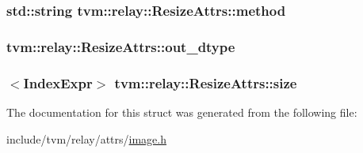 \subsubsection[{\texorpdfstring{method}{method}}]{\setlength{\rightskip}{0pt plus 5cm}std\+::string tvm\+::relay\+::\+Resize\+Attrs\+::method}\hypertarget{structtvm_1_1relay_1_1ResizeAttrs_a45a5182646e979ac0d4f1f181005e7d6}{}\label{structtvm_1_1relay_1_1ResizeAttrs_a45a5182646e979ac0d4f1f181005e7d6}
\subsubsection[{\texorpdfstring{out\+\_\+dtype}{out_dtype}}]{ tvm\+::relay\+::\+Resize\+Attrs\+::out\+\_\+dtype}\hypertarget{structtvm_1_1relay_1_1ResizeAttrs_ab1c2f6194ad51429a976105bcbeeef17}{}\label{structtvm_1_1relay_1_1ResizeAttrs_ab1c2f6194ad51429a976105bcbeeef17}
\subsubsection[{\texorpdfstring{size}{size}}]{$<${\bf Index\+Expr}$>$ tvm\+::relay\+::\+Resize\+Attrs\+::size}\hypertarget{structtvm_1_1relay_1_1ResizeAttrs_aef3ecbf87f57550f42f4a92f6a80b5c8}{}\label{structtvm_1_1relay_1_1ResizeAttrs_aef3ecbf87f57550f42f4a92f6a80b5c8}


The documentation for this struct was generated from the following file\+:\begin{DoxyCompactItemize}
\item 
include/tvm/relay/attrs/\hyperlink{image_8h}{image.\+h}\end{DoxyCompactItemize}
